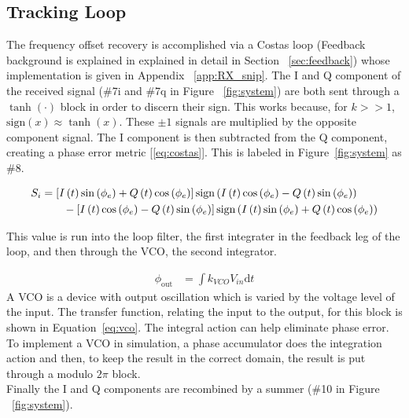 \documentclass[]{article}
\newcommand{\rom}[1]{\uppercase\expandafter{\romannumeral#1}}
\begin{document}
\subsection{Tracking Loop}
\label{sec:tracking}
The frequency offset  recovery is accomplished via a Costas loop (Feedback background is explained in explained in detail in Section ~\ref{sec:feedback}) whose implementation is given in Appendix ~\ref{app:RX_snip}. The I and Q component of the received signal (\#7i and \#7q in Figure ~\ref{fig:system}) are both sent through a $\tanh\left(\cdot\right)$ block in order to discern their sign.  This works because, for $k>>1$, $\text{sign}\left(x\right) \approx \tanh \left(x\right)$.  These $\pm1$ signals are multiplied by the opposite component signal.  The I component is then subtracted from the Q component, creating a phase error metric [\ref{eq:costas}].  This is labeled in Figure~\ref{fig:system} as \#8. 

\begin{align}
  \label{eq:costas}
  S_{\rom{1}} &= \left[I\left(t\right)\sin\left(\phi_e\right)+Q\left(t\right)\cos\left(\phi_e\right)\right]\text{sign}\left(I\left(t\right)\cos\left(\phi_e\right)- Q\left(t\right)\sin\left(\phi_e\right)\right)\nonumber \\
  &\qquad {} - \left[I\left(t\right)\cos\left(\phi_e\right)-Q\left(t\right)\sin\left(\phi_e\right)\right]\text{sign}\left(I\left(t\right)\sin\left(\phi_e\right)+Q\left(t\right)\cos\left(\phi_e\right)\right)
  \end{align}

This value is run into the loop filter, the first integrater in the feedback leg of the loop, and then through the VCO, the second integrator.
  
\begin{align}
\label{eq:vco}
\phi_{\text{out}} &= \int \! k_{VCO}V_{in} \mathrm{d}t
\end{align}
A VCO is a device with output oscillation which is varied by the voltage level of the input.  The transfer function, relating the input to the output, for this block is shown in Equation~\ref{eq:vco}. The integral action can help eliminate phase error. To implement a VCO in simulation, a phase accumulator does the integration action and then, to keep the result in the correct domain, the result is put through a modulo $2\pi$ block. \\

Finally the I and Q components are recombined by a summer (\#10 in Figure ~\ref{fig:system}). \\
\end{document}
